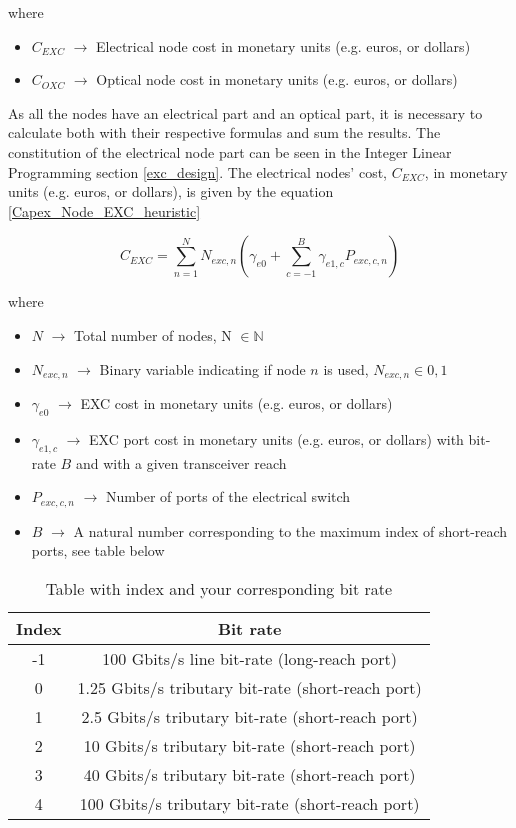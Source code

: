 \noindent
where

\begin{itemize}
\item {$C_{EXC}$        $\rightarrow$   Electrical node cost in monetary units (e.g. euros, or dollars)}
\item {$C_{OXC}$        $\rightarrow$   Optical node cost in monetary units (e.g. euros, or dollars)}
\end{itemize}

\vspace{11pt}
As all the nodes have an electrical part and an optical part, it is necessary to calculate both with their respective formulas and sum the results. The constitution of the electrical node part can be seen in the Integer Linear Programming section \ref{exc_design}. The electrical nodes' cost, $C_{EXC}$, in monetary units (e.g. euros, or dollars), is given by the equation \ref{Capex_Node_EXC_heuristic}

\begin{equation}
C_{EXC} = \sum_{n=1}^{N} N_{exc,n} \left( \gamma_{e0} + \sum_{c=-1}^B \gamma_{e1,c} P_{exc,c,n} \right)
\label{Capex_Node_EXC_heuristic}
\end{equation}

\noindent
where

\begin{itemize}
\item{$N$				$\rightarrow$	Total number of nodes, N $\in \mathbb{N}$}
\item{$N_{exc,n}$		$\rightarrow$	Binary variable indicating if node $n$ is used, $N_{exc,n} \in {0, 1}$}
\item{$\gamma_{e0}$ 	$\rightarrow$	EXC cost in monetary units (e.g. euros, or dollars)}
\item{$\gamma_{e1,c}$	$\rightarrow$	EXC port cost in monetary units (e.g. euros, or dollars) with bit-rate $B$ and with a given transceiver reach}
\item{$P_{exc,c,n}$	    $\rightarrow$	Number of ports of the electrical switch}
\item{$B$           	$\rightarrow$	A natural number corresponding to the maximum index of short-reach ports, see table below}
\end{itemize}

\begin{table}[H]
\centering
\begin{tabular}{|c|c|}
  \hline
  Index & Bit rate \\
 \hline\hline
  -1 & 100 Gbits/s line bit-rate (long-reach port) \\
  0 & 1.25 Gbits/s tributary bit-rate (short-reach port) \\
  1 & 2.5 Gbits/s tributary bit-rate (short-reach port) \\
  2 & 10 Gbits/s tributary bit-rate (short-reach port) \\
  3 & 40 Gbits/s tributary bit-rate (short-reach port) \\
  4 & 100 Gbits/s tributary bit-rate (short-reach port) \\
  \hline
\end{tabular}
\caption{Table with index and your corresponding bit rate}
\label{table_bitrate_heuristic}
\end{table}

